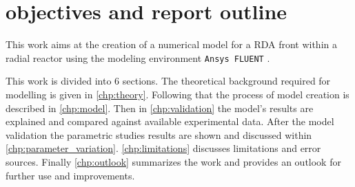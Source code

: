 \documentclass[../thesis.tex]{subfiles}
\begin{document}
\section{objectives and report outline}

This work aims at the creation of a numerical model for a RDA front within a radial reactor using the modeling environment \texttt{Ansys FLUENT} \cite{manual2009ansys}. 

This work is divided into 6 sections. The theoretical background required for modelling is given in \autoref{chp:theory}. Following that the process of model creation is described in \autoref{chp:model}. Then in \autoref{chp:validation} the model's results are explained and compared against available experimental data. After the model validation the parametric studies results are shown and discussed within \autoref{chp:parameter_variation}. \autoref{chp:limitations} discusses limitations and error sources. Finally \autoref{chp:outlook} summarizes the work and provides an outlook for further use and improvements.


\end{document}
